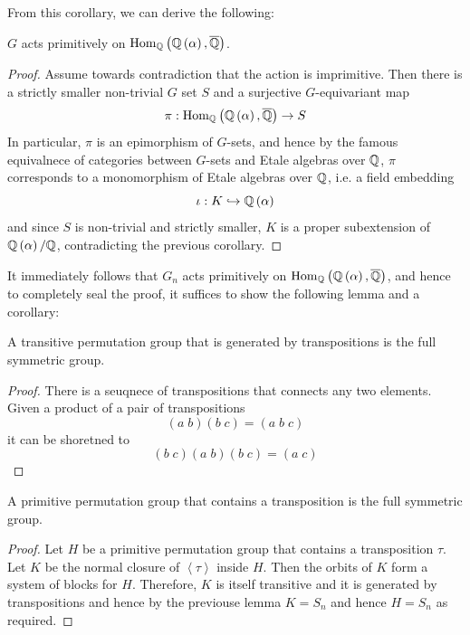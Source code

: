 \documentclass[../main.tex]{subfiles}
\begin{document}
From this corollary, we can derive the following: 
\begin{corollary}
  $G$ acts primitively on $\operatorname{\rm Hom}_{\mathbb{Q}}\left( \mathbb{Q}\left( \alpha \right), \overline{\mathbb{Q}} \right)$.
\end{corollary}
\begin{proof}
  Assume towards contradiction that the action is imprimitive.
  Then there is a strictly smaller non-trivial $G$ set $S$ and a surjective $G$-equivariant map
  \[
    \pi : \operatorname{\rm Hom}_{\mathbb{Q}}\left( \mathbb{Q}\left( \alpha \right), \overline{\mathbb{Q}} \right) \to S
  \]
  In particular, $\pi$ is an epimorphism of $G$-sets, and hence by the famous equivalnece of categories between $G$-sets and Etale algebras over $\mathbb{Q}$, $\pi$ corresponds to a monomorphism of Etale algebras over $\mathbb{Q}$, i.e. a field embedding 
  \[
    \iota : K \hookrightarrow \mathbb{Q}\left( \alpha \right)
  \]
  and since $S$ is non-trivial and strictly smaller, $K$ is a proper subextension of $\mathbb{Q}\left( \alpha \right)/\mathbb{Q}$, contradicting the previous corollary.
\end{proof}
It immediately follows that $G_n$ acts primitively on $\operatorname{\rm Hom}_{\mathbb{Q}}\left( \mathbb{Q}\left( \alpha \right), \overline{\mathbb{Q}} \right)$, and hence to completely seal the proof, it suffices to show the following lemma and a corollary:
\begin{lemma}
  A transitive permutation group that is generated by transpositions is the full symmetric group.
\end{lemma}
\begin{proof}

  There is a seuqnece of transpositions that connects any two elements.
  Given a product of a pair of transpositions 
  \[
    \left( a \; b \right) \left( b \; c \right) = \left( a \; b \; c \right)
  \]
  it can be shoretned to 
  \[
    \left( b \; c \right) \left( a \; b \right) \left( b \; c \right) = \left( a \; c \right) 
  \]
\end{proof}
\begin{corollary}
  A primitive permutation group that contains a transposition is the full symmetric group.
\end{corollary}
\begin{proof}

  Let $H$ be a primitive permutation group that contains a transposition $\tau$.
  Let $K$ be the normal closure of $\left< \tau \right>$ inside $H$.
  Then the orbits of $K$ form a system of blocks for $H$.
  Therefore, $K$ is itself transitive and it is generated by transpositions and hence by the previouse lemma $K = S_n$ and hence $H = S_n$ as required.
\end{proof}
\end{document}

